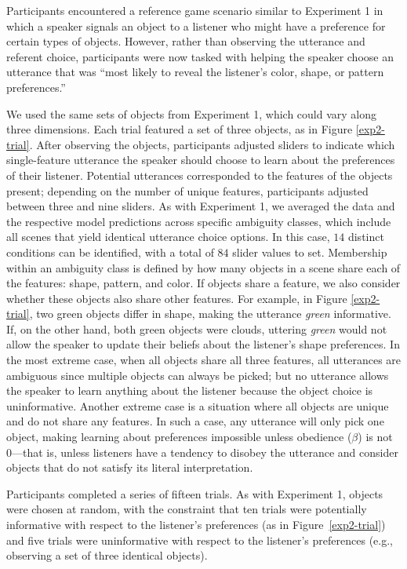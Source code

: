 \documentclass[10pt,a4paper]{article}
\begin{document}
Participants encountered a reference game scenario similar to Experiment 1 in which a speaker signals an object to a listener who might have a preference for certain types of objects. However, rather than observing the utterance and referent choice, participants were now tasked with helping the speaker choose an utterance that was ``most likely to reveal the listener's color, shape, or pattern preferences.''

We used the same sets of objects from Experiment 1, which could vary along three dimensions. Each trial featured a set of three objects, as in Figure \ref{exp2-trial}. After observing the objects, participants adjusted sliders to indicate which single-feature utterance the speaker should choose to learn about the preferences of their listener. Potential utterances corresponded to the features of the objects present; depending on the number of unique features, participants adjusted between three and nine sliders. As with Experiment 1, we averaged the data and the respective model predictions across specific ambiguity classes, which include all scenes that yield identical utterance choice options. 
In this case, $14$ distinct conditions can be identified, with a total of $84$ slider values to set. 
Membership within an ambiguity class is defined by how many objects in a scene share each of the features: shape, pattern, and color. If objects share a feature, we also consider whether these objects also share other features. For example, in Figure \ref{exp2-trial}, two green objects differ in shape, making the utterance \textit{green} informative. If, on the other hand, both green objects were clouds, uttering \textit{green} would not allow the speaker to update their beliefs about the listener's shape preferences.
In the most extreme case, when all objects share all three features, all utterances are ambiguous since multiple objects can always be picked; but no utterance allows the speaker to learn anything about the listener because the object choice is uninformative. Another extreme case is a situation where all objects are unique and do not share any features. In such a case, any utterance will only pick one object, making learning about preferences impossible unless obedience ($\beta$) is not 0---that is, unless listeners have a tendency to disobey the utterance and consider objects that do not satisfy its literal interpretation.

Participants completed a series of fifteen trials. As with Experiment 1, objects were chosen at random, with the constraint that ten trials were potentially informative with respect to the listener's preferences (as in Figure~\ref{exp2-trial}) and five trials were uninformative with respect to the listener's preferences (e.g., observing a set of three identical objects).
\end{document}
